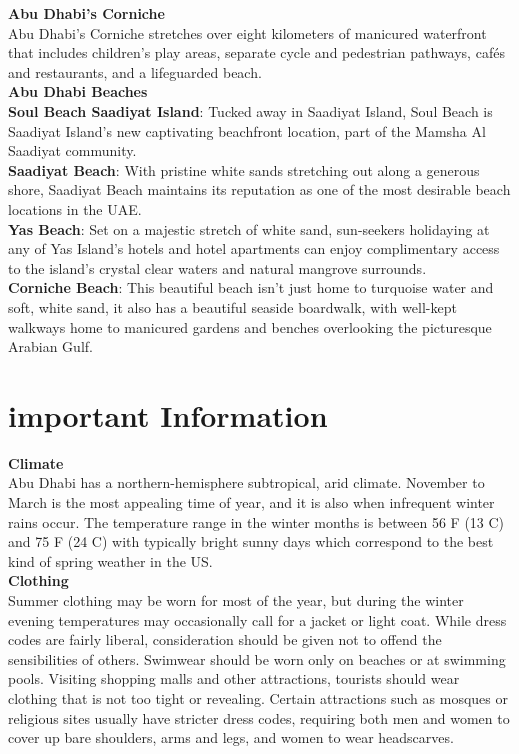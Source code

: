 {\large \textbf{Abu Dhabi’s Corniche}}\\
Abu Dhabi’s Corniche stretches over eight kilometers of manicured waterfront that includes children’s play areas,
separate cycle and pedestrian pathways, cafés and restaurants, and a lifeguarded beach.\\

{\large \textbf{Abu Dhabi Beaches}}\\
\textbf{Soul Beach Saadiyat Island}: Tucked away in Saadiyat Island, Soul Beach is Saadiyat Island’s new captivating beachfront location, part of the Mamsha Al Saadiyat community.\\
\textbf{Saadiyat Beach}: With pristine white sands stretching out along a generous shore, Saadiyat Beach maintains its reputation as one of the most desirable beach locations in the UAE.\\
\textbf{Yas Beach}: Set on a majestic stretch of white sand, sun-seekers holidaying at any of Yas Island’s hotels and hotel apartments can enjoy complimentary access to the island’s crystal clear waters and natural mangrove surrounds.\\
\textbf{Corniche Beach}: This beautiful beach isn’t just home to turquoise water and soft, white sand, it also has a beautiful seaside boardwalk, with well-kept walkways home to manicured gardens and benches overlooking the picturesque Arabian Gulf.\\


 \leavevmode\newline
\section{important Information}

{\large \textbf{Climate}}\\
Abu Dhabi has a northern-hemisphere subtropical, arid climate. November to March is the most appealing time of year, and it is also when infrequent winter rains occur.
The temperature range in the winter months is between 56 F (13 C) and 75 F (24 C) with typically bright sunny days which correspond to the best kind of spring weather in the US.\\

{\large \textbf{Clothing}}\\
Summer clothing may be worn for most of the year, but during the winter evening temperatures may occasionally call for a jacket or light coat. 
While dress codes are fairly liberal, consideration should be given not to offend the sensibilities of others. 
Swimwear should be worn only on beaches or at swimming pools. Visiting shopping malls and other attractions, tourists should wear clothing that is not too tight or revealing. 
Certain attractions such as mosques or religious sites usually have stricter dress codes, requiring both men and women to cover up bare shoulders, arms and legs, and women to wear headscarves.\\

